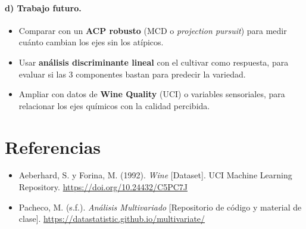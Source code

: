 \documentclass[11pt,a4paper]{article}
\begin{document}
\paragraph{d) Trabajo futuro.}
\begin{itemize}[leftmargin=*]
  \item Comparar con un \textbf{ACP robusto} (MCD o \emph{projection pursuit}) para medir cuánto cambian los ejes sin los atípicos.
  \item Usar \textbf{análisis discriminante lineal} con el cultivar como respuesta, para evaluar si las 3 componentes bastan para predecir la variedad.
  \item Ampliar con datos de \textbf{Wine Quality} (UCI) o variables sensoriales, para relacionar los ejes químicos con la calidad percibida.
\end{itemize}

\section*{Referencias}
\begin{itemize}[leftmargin=*, label={}]
  \item Aeberhard, S. y Forina, M. (1992). \emph{Wine} [Dataset]. UCI Machine Learning Repository. \url{https://doi.org/10.24432/C5PC7J}
  \item Pacheco, M. (s.f.). \emph{Análisis Multivariado} [Repositorio de código y material de clase]. \url{https://datastatistic.github.io/multivariate/}
\end{itemize}
\end{document}
